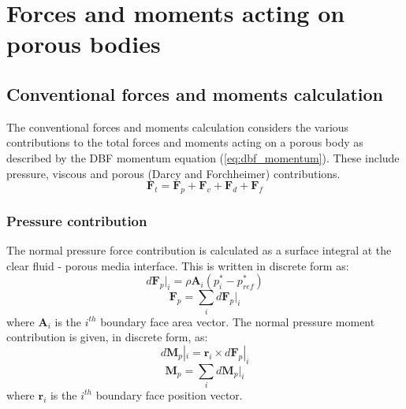 \documentclass[a4paper,11pt]{report}
\begin{document}
\chapter{Forces and moments acting on porous bodies}
\section{Conventional forces and moments calculation} \label{sec:Conventional_forces_moments}
The conventional forces and moments calculation considers the various contributions to the total forces and moments acting on a porous body as described by the DBF momentum equation (\ref{eq:dbf_momentum}). These include pressure, viscous and porous (Darcy and Forchheimer) contributions.
\begin{equation}
    \mathbf{F}_{t} = \mathbf{F}_{p} + \mathbf{F}_{v} + \mathbf{F}_{d} + \mathbf{F}_{f}
    \label{eq:Ftot}
\end{equation}
\subsection{Pressure contribution} \label{subsec:Pressure}
The normal pressure force contribution is calculated as a surface integral at the clear fluid - porous media interface. This is written in discrete form as:
\begin{equation}
    d\mathbf{F}_p|_i = \rho\mathbf{A}_i(p_i^*-p_{ref}^*)
    \label{eq:dFpi}
\end{equation}
\begin{equation}
    \mathbf{F}_p = \sum_i d\mathbf{F}_p|_i
    \label{eq:Fp}
\end{equation}
where $\mathbf{A}_i$ is the $i^{th}$ boundary face area vector. The normal pressure moment contribution is given, in discrete form, as:
\begin{equation}
    d\mathbf{M}_p|_i = \mathbf{r}_i\times d\mathbf{F}_p|_i
    \label{eq:dMpi}
\end{equation}
\begin{equation}
    \mathbf{M}_p = \sum_i d\mathbf{M}_p|_i
    \label{eq:Mp}
\end{equation}
where $\mathbf{r}_i$ is the $i^{th}$ boundary face position vector.
\end{document}
